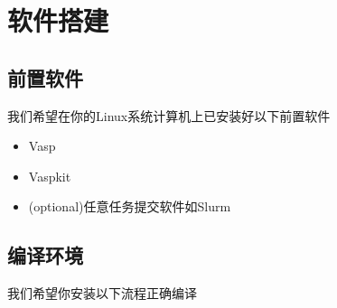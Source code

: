 \chapter{软件搭建}\label{sec:method}
\section{前置软件}
我们希望在你的Linux系统计算机上已安装好以下前置软件
\begin{itemize}
	\item Vasp
	\item Vaspkit
	\item (optional)任意任务提交软件如Slurm
\end{itemize}

\section{编译环境}
我们希望你安装以下流程正确编译 \Quee\
